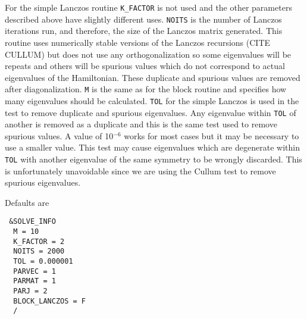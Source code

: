 \documentclass{article}
\begin{document}
For the simple Lanczos routine {\tt K\_FACTOR} is not used and the other parameters described above
have slightly different uses. {\tt NOITS} is the number of Lanczos iterations run, and therefore, the
size of the Lanczos matrix generated. This routine uses numerically stable versions of the Lanczos recursions (CITE CULLUM) but does not use any orthogonalization so some
eigenvalues will be repeats and others will be spurious values which do not correspond to actual
eigenvalues of the Hamiltonian. These duplicate and spurious values are removed after diagonalization. {\tt M} is the same as for the block routine and specifies how many eigenvalues should be calculated. {\tt TOL} for the simple Lanczos is used
in the test to remove duplicate and spurious eigenvalues. Any eigenvalue within {\tt TOL} of another
is removed as a duplicate and this is the same test used to remove spurious values. A value
of 10$^{-6}$ works for most cases but it may be necessary to use a smaller value. This test may cause eigenvalues which are degenerate within {\tt TOL} with another eigenvalue of the same symmetry to be wrongly discarded. This is unfortunately unavoidable since we are using the Cullum test to remove spurious eigenvalues.

Defaults are

\begin{verbatim}
 &SOLVE_INFO
  M = 10
  K_FACTOR = 2
  NOITS = 2000
  TOL = 0.000001
  PARVEC = 1
  PARMAT = 1
  PARJ = 2
  BLOCK_LANCZOS = F
  /
\end{verbatim}
\end{document}

